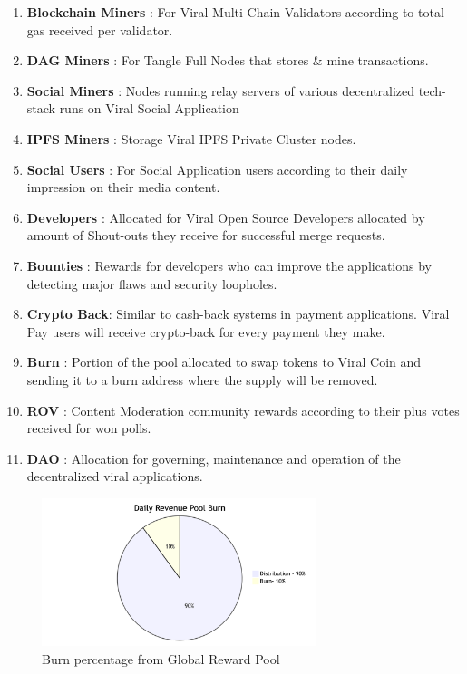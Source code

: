 \documentclass[conference]{IEEEtran}
\begin{document}
\begin{enumerate}[wide, labelwidth=!, labelindent=0pt]
\item \textbf{Blockchain Miners} : For Viral Multi-Chain Validators according to total gas received per validator.
\item \textbf{DAG Miners} : For Tangle Full Nodes that stores \& mine transactions.
\item \textbf{Social Miners} : Nodes running relay servers of various decentralized tech-stack runs on Viral Social Application
\item \textbf{IPFS Miners} : Storage Viral IPFS Private Cluster nodes.
\item \textbf{Social Users} : For Social Application users according to their daily impression on their media content.
\item \textbf{Developers} : Allocated for Viral Open Source Developers allocated by amount of Shout-outs they receive for successful merge requests.
\item \textbf{Bounties} : Rewards for developers who can improve the applications by detecting major flaws and security loopholes.
\item \textbf{Crypto Back}: Similar to cash-back systems in payment applications. Viral Pay users will receive crypto-back for every payment they make.
\item \textbf{Burn} : Portion of the pool allocated to swap tokens to Viral Coin and sending it to a burn address where the supply will be removed.
\item \textbf{ROV} : Content Moderation community rewards according to their plus votes received for won polls.
\item \textbf{DAO} : Allocation for governing, maintenance and operation of the decentralized viral applications.
\end{enumerate} 

\begin{figure}[H]
\begin{center}
\includegraphics[width=8cm]{burn-chart}
\caption{Burn percentage from Global Reward Pool}
\end{center}
\end{figure}
\end{document}
